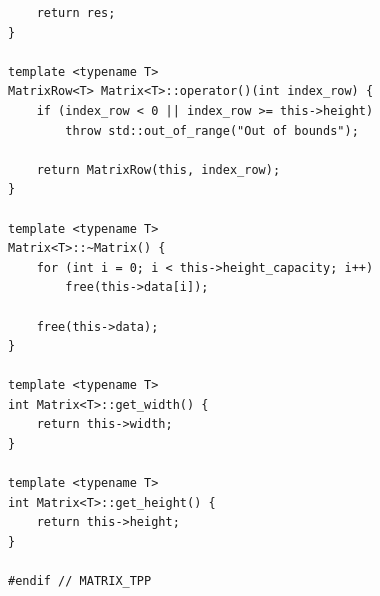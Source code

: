 \documentclass[a4paper,14pt]{extarticle}
\begin{document}
\begin{verbatim}
    return res;
}

template <typename T>
MatrixRow<T> Matrix<T>::operator()(int index_row) {
    if (index_row < 0 || index_row >= this->height)
        throw std::out_of_range("Out of bounds");

    return MatrixRow(this, index_row);
}

template <typename T>
Matrix<T>::~Matrix() {
    for (int i = 0; i < this->height_capacity; i++)
        free(this->data[i]);

    free(this->data);
}

template <typename T>
int Matrix<T>::get_width() {
    return this->width;
}

template <typename T>
int Matrix<T>::get_height() {
    return this->height;
}

#endif // MATRIX_TPP
\end{verbatim}
\end{document}
